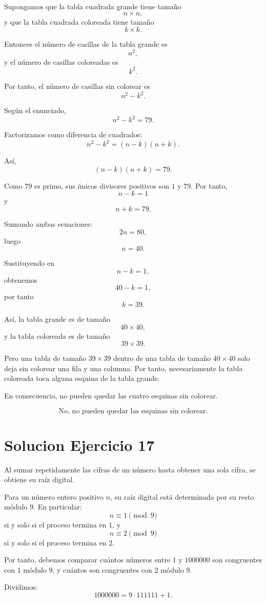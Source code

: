 \documentclass[12pt]{article}
\begin{document}
Supongamos que la tabla cuadrada grande tiene tamaño
\[
n\times n,
\]
y que la tabla cuadrada coloreada tiene tamaño
\[
k\times k.
\]

Entonces el número de casillas de la tabla grande es
\[
n^2,
\]
y el número de casillas coloreadas es
\[
k^2.
\]

Por tanto, el número de casillas sin colorear es
\[
n^2-k^2.
\]

Según el enunciado,
\[
n^2-k^2=79.
\]

Factorizamos como diferencia de cuadrados:
\[
n^2-k^2=(n-k)(n+k).
\]

Así,
\[
(n-k)(n+k)=79.
\]

Como \(79\) es primo, sus únicos divisores positivos son \(1\) y \(79\). Por tanto,
\[
n-k=1
\]
y
\[
n+k=79.
\]

Sumando ambas ecuaciones:
\[
2n=80,
\]
luego
\[
n=40.
\]

Sustituyendo en
\[
n-k=1,
\]
obtenemos
\[
40-k=1,
\]
por tanto
\[
k=39.
\]

Así, la tabla grande es de tamaño
\[
40\times 40,
\]
y la tabla coloreada es de tamaño
\[
39\times 39.
\]

Pero una tabla de tamaño \(39\times 39\) dentro de una tabla de tamaño \(40\times 40\) solo deja sin colorear una fila y una columna. Por tanto, necesariamente la tabla coloreada toca alguna esquina de la tabla grande.

En consecuencia, no pueden quedar las cuatro esquinas sin colorear.

\[
\boxed{\text{No, no pueden quedar las esquinas sin colorear.}}
\]

\section*{Solucion Ejercicio 17}

Al sumar repetidamente las cifras de un número hasta obtener una sola cifra, se obtiene su raíz digital.

Para un número entero positivo \(n\), su raíz digital está determinada por su resto módulo \(9\). En particular:
\[
n\equiv 1\pmod 9
\]
si y solo si el proceso termina en \(1\), y
\[
n\equiv 2\pmod 9
\]
si y solo si el proceso termina en \(2\).

Por tanto, debemos comparar cuántos números entre \(1\) y \(1000000\) son congruentes con \(1\) módulo \(9\), y cuántos son congruentes con \(2\) módulo \(9\).

Dividimos:
\[
1000000=9\cdot 111111+1.
\]
\end{document}
